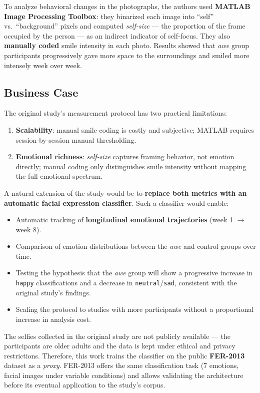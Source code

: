 \documentclass[12pt, a4paper]{article}
\begin{document}
To analyze behavioral changes in the photographs, the authors used \textbf{MATLAB Image
Processing Toolbox}: they binarized each image into ``self'' vs.\ ``background'' pixels and
computed \textit{self-size} --- the proportion of the frame occupied by the person --- as an
indirect indicator of self-focus. They also \textbf{manually coded} smile intensity in each
photo. Results showed that \textit{awe} group participants progressively gave more space to the
surroundings and smiled more intensely week over week.

\subsection{Business Case}

The original study's measurement protocol has two practical limitations:

\begin{enumerate}
  \item \textbf{Scalability}: manual smile coding is costly and subjective; MATLAB requires
        session-by-session manual thresholding.
  \item \textbf{Emotional richness}: \textit{self-size} captures framing behavior, not emotion
        directly; manual coding only distinguishes smile intensity without mapping the full
        emotional spectrum.
\end{enumerate}

A natural extension of the study would be to \textbf{replace both metrics with an automatic
facial expression classifier}. Such a classifier would enable:

\begin{itemize}
  \item Automatic tracking of \textbf{longitudinal emotional trajectories}
        (week 1 $\to$ week 8).
  \item Comparison of emotion distributions between the \textit{awe} and control groups
        over time.
  \item Testing the hypothesis that the \textit{awe} group will show a progressive increase in
        \texttt{happy} classifications and a decrease in \texttt{neutral}/\texttt{sad},
        consistent with the original study's findings.
  \item Scaling the protocol to studies with more participants without a proportional increase
        in analysis cost.
\end{itemize}

The selfies collected in the original study are not publicly available --- the participants are
older adults and the data is kept under ethical and privacy restrictions. Therefore, this work
trains the classifier on the public \textbf{FER-2013} dataset as a \textit{proxy}. FER-2013
offers the same classification task (7 emotions, facial images under variable conditions) and
allows validating the architecture before its eventual application to the study's corpus.
\end{document}
